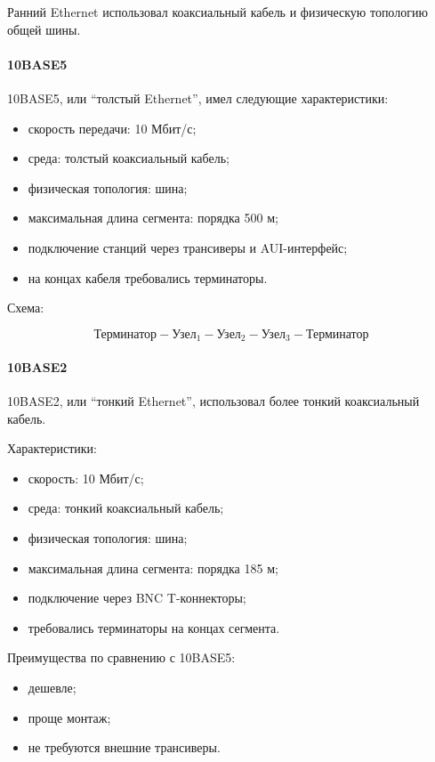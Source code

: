 \documentclass[12pt,a4paper]{article}
\begin{document}
Ранний Ethernet использовал коаксиальный кабель и физическую топологию общей шины.

\paragraph{10BASE5}

10BASE5, или ``толстый Ethernet'', имел следующие характеристики:
\begin{itemize}
    \item скорость передачи: 10 Мбит/с;
    \item среда: толстый коаксиальный кабель;
    \item физическая топология: шина;
    \item максимальная длина сегмента: порядка 500 м;
    \item подключение станций через трансиверы и AUI-интерфейс;
    \item на концах кабеля требовались терминаторы.
\end{itemize}

Схема:

\[
\text{Терминатор} - \text{Узел}_1 - \text{Узел}_2 - \text{Узел}_3 - \text{Терминатор}
\]

\paragraph{10BASE2}

10BASE2, или ``тонкий Ethernet'', использовал более тонкий коаксиальный кабель.

Характеристики:
\begin{itemize}
    \item скорость: 10 Мбит/с;
    \item среда: тонкий коаксиальный кабель;
    \item физическая топология: шина;
    \item максимальная длина сегмента: порядка 185 м;
    \item подключение через BNC T-коннекторы;
    \item требовались терминаторы на концах сегмента.
\end{itemize}

Преимущества по сравнению с 10BASE5:
\begin{itemize}
    \item дешевле;
    \item проще монтаж;
    \item не требуются внешние трансиверы.
\end{itemize}
\end{document}
